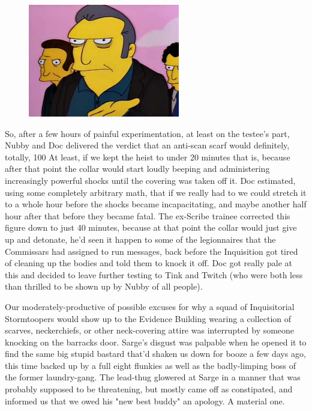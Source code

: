 \begin{figure}
	\begin{center}
		\includegraphics[width=\figwidth]{pics/21/36.png}
	\end{center}
\end{figure}
So, after a few hours of painful experimentation, at least on the testee's part, Nubby and Doc delivered the verdict that an anti-scan scarf would definitely, totally, 100%
At least, if we kept the heist to under 20 minutes that is, because after that point the collar would start loudly beeping and administering increasingly powerful shocks until the covering was taken off it. 
Doc estimated, using some completely arbitrary math, that if we really had to we could stretch it to a whole hour before the shocks became incapacitating, and maybe another half hour after that before they became fatal. 
The ex-Scribe trainee corrected this figure down to just 40 minutes, because at that point the collar would just give up and detonate, he'd seen it happen to some of the legionnaires that the Commissars had assigned to run messages, back before the Inquisition got tired of cleaning up the bodies and told them to knock it off. 
Doc got really pale at this and decided to leave further testing to Tink and Twitch (who were both less than thrilled to be shown up by Nubby of all people).

Our moderately-productive of possible excuses for why a squad of Inquisitorial Stormtoopers would show up to the Evidence Building wearing a collection of scarves, neckerchiefs, or other neck-covering attire was interrupted by someone knocking on the barracks door. 
Sarge's disgust was palpable when he opened it to find the same big stupid bastard that'd shaken us down for booze a few days ago, this time backed up by a full eight flunkies as well as the badly-limping boss of the former laundry-gang. 
The lead-thug glowered at Sarge in a manner that was probably supposed to be threatening, but mostly came off as constipated, and informed us that we owed his "new best buddy" an apology. 
A material one.

